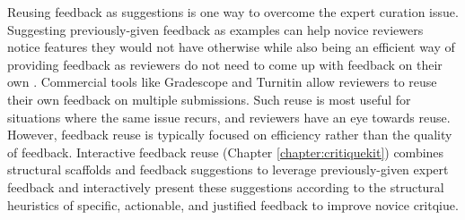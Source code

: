 Reusing feedback as suggestions is one way to overcome the expert curation issue. Suggesting previously-given feedback as examples can help novice reviewers notice features they would not have otherwise while also being an efficient way of providing feedback as reviewers do not need to come up with feedback on their own \cite{Greenberg2015, kulkarni2013peer, Luther2015}. Commercial tools like Gradescope \cite{Gradescope} and Turnitin \cite{Turnitin} allow reviewers to reuse their own feedback on multiple submissions. Such reuse is most useful for situations where the same issue recurs, and reviewers have an eye towards reuse. However, feedback reuse is typically focused on efficiency rather than the quality of feedback. Interactive feedback reuse (Chapter \ref{chapter:critiquekit}) combines structural scaffolds and feedback suggestions to leverage previously-given expert feedback and interactively present these suggestions according to the structural heuristics of specific, actionable, and justified feedback to improve novice critqiue. 
